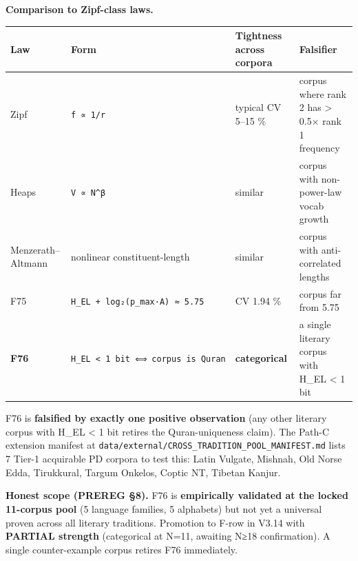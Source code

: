 \documentclass[
]{article}
\newcounter{none} %
\begin{document}
\textbf{Comparison to Zipf-class laws.}

{\def\LTcaptype{none} %
\begin{longtable}[]{@{}
  >{\raggedright\arraybackslash}p{}
  >{\raggedright\arraybackslash}p{}
  >{\raggedright\arraybackslash}p{}
  >{\raggedright\arraybackslash}p{}@{}}
\toprule\noalign{}
\begin{minipage}[b]{\linewidth}\raggedright
Law
\end{minipage} & \begin{minipage}[b]{\linewidth}\raggedright
Form
\end{minipage} & \begin{minipage}[b]{\linewidth}\raggedright
Tightness across corpora
\end{minipage} & \begin{minipage}[b]{\linewidth}\raggedright
Falsifier
\end{minipage} \\
\midrule\noalign{}
\endhead
\bottomrule\noalign{}
\endlastfoot
Zipf & \texttt{f\ ∝\ 1/r} & typical CV 5--15 \% & corpus where rank 2
has \textgreater{} 0.5× rank 1 frequency \\
Heaps & \texttt{V\ ∝\ N\^{}β} & similar & corpus with non-power-law
vocab growth \\
Menzerath--Altmann & nonlinear constituent-length & similar & corpus
with anti-correlated lengths \\
F75 & \texttt{H\_EL\ +\ log₂(p\_max·A)\ ≈\ 5.75} & CV 1.94 \% & corpus
far from 5.75 \\
\textbf{F76} & \texttt{H\_EL\ \textless{}\ 1\ bit\ ⟺\ corpus\ is\ Quran}
& \textbf{categorical} & a single literary corpus with H\_EL \textless{}
1 bit \\
\end{longtable}
}

F76 is \textbf{falsified by exactly one positive observation} (any other
literary corpus with H\_EL \textless{} 1 bit retires the
Quran-uniqueness claim). The Path-C extension manifest at
\texttt{data/external/CROSS\_TRADITION\_POOL\_MANIFEST.md} lists 7
Tier-1 acquirable PD corpora to test this: Latin Vulgate, Mishnah, Old
Norse Edda, Tirukkural, Targum Onkelos, Coptic NT, Tibetan Kanjur.

\textbf{Honest scope (PREREG §8).} F76 is \textbf{empirically validated
at the locked 11-corpus pool} (5 language families, 5 alphabets) but not
yet a universal proven across all literary traditions. Promotion to
F-row in V3.14 with \textbf{PARTIAL strength} (categorical at N=11,
awaiting N≥18 confirmation). A single counter-example corpus retires F76
immediately.
\end{document}
